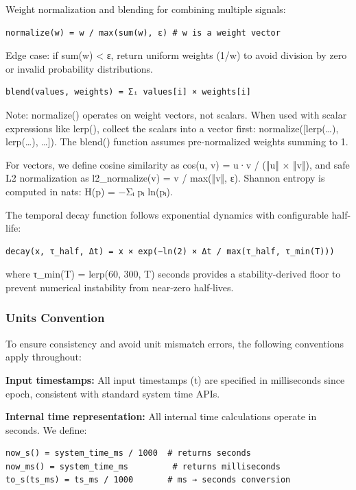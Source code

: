 \documentclass[
  letterpaper,
  DIV=11,
  numbers=noendperiod]{scrartcl}
\begin{document}
Weight normalization and blending for combining multiple signals:

\begin{verbatim}
normalize(w) = w / max(sum(w), ε) # w is a weight vector
\end{verbatim}

Edge case: if sum(w) \textless{} ε, return uniform weights
(1/\textbar w\textbar) to avoid division by zero or invalid probability
distributions.

\begin{verbatim}
blend(values, weights) = Σᵢ values[i] × weights[i]
\end{verbatim}

Note: normalize() operates on weight vectors, not scalars. When used
with scalar expressions like lerp(), collect the scalars into a vector
first: normalize({[}lerp(\ldots), lerp(\ldots), \ldots{]}). The blend()
function assumes pre-normalized weights summing to 1.

For vectors, we define cosine similarity as cos(u, v) = u·v / (‖u‖ ×
‖v‖), and safe L2 normalization as l2\_normalize(v) = v / max(‖v‖, ε).
Shannon entropy is computed in nats: H(p) = −Σᵢ pᵢ ln(pᵢ).

The temporal decay function follows exponential dynamics with
configurable half-life:

\begin{verbatim}
decay(x, τ_half, Δt) = x × exp(−ln(2) × Δt / max(τ_half, τ_min(T)))
\end{verbatim}

where τ\_min(T) = lerp(60, 300, T) seconds provides a stability-derived
floor to prevent numerical instability from near-zero half-lives.

\subsubsection{Units Convention}\label{units-convention}

To ensure consistency and avoid unit mismatch errors, the following
conventions apply throughout:

\textbf{Input timestamps:} All input timestamps (t) are specified in
milliseconds since epoch, consistent with standard system time APIs.

\textbf{Internal time representation:} All internal time calculations
operate in seconds. We define:

\begin{verbatim}
now_s() = system_time_ms / 1000  # returns seconds
now_ms() = system_time_ms         # returns milliseconds
to_s(ts_ms) = ts_ms / 1000       # ms → seconds conversion
\end{verbatim}
\end{document}
